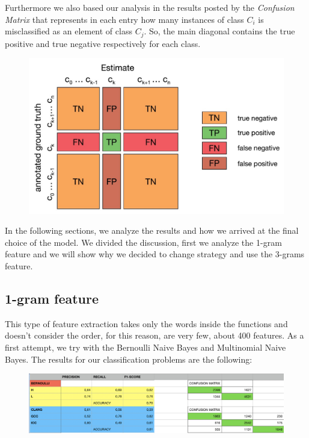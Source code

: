 \documentclass[12pt]{article}
\begin{document}
Furthermore we also based our analysis in the results posted by the {\em Confusion Matrix} that represents in each entry how many instances of class $C_i$
is misclassified as an element of class $C_j$. So, the main diagonal contains the true positive and true negative respectively for each class.
\begin{figure}[!ht]
 \includegraphics[width=1\textwidth]{pic2}
 \label{fig: Confusion Matrix}
\end{figure}
\newpage

In the following sections, we analyze the results and how we arrived at the final choice of the model. We divided the discussion, first we analyze the 1-gram feature and we will show why we decided to change strategy and use the 3-grams feature.

\subsection{1-gram feature}
This type of feature extraction takes only the words inside the functions and doesn't consider the order, for this reason, are very few, about 400 features. As a first attempt, we try with the Bernoulli Naive Bayes and Multinomial Naive Bayes. The results for our classification problems are the following:
\begin{figure}[!ht]
 \includegraphics[width=1\textwidth]{pic3}
 \label{fig: Bernoulli with 1-gram}
\end{figure}
\end{document}
